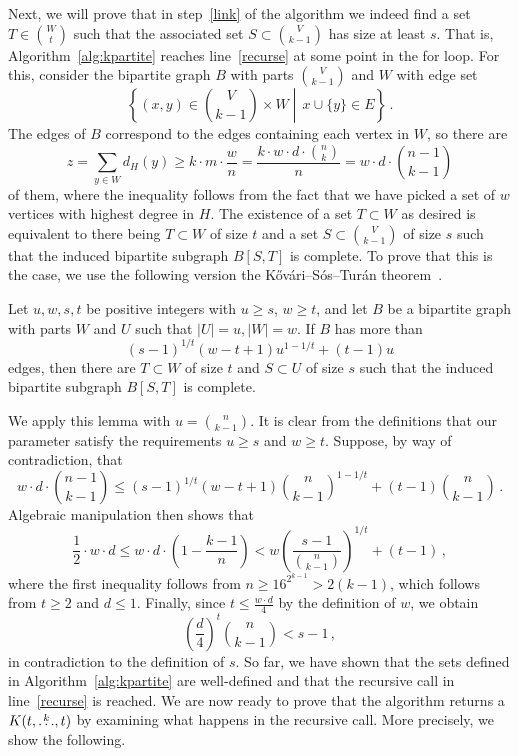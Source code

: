 Next, we will prove that in step~\ref{link} of the algorithm
we indeed find a set $T \in \binom{W}{t}$ such that the associated set
$S \subset \binom{V}{k-1}$ has size at least $s$.
That is, Algorithm~\ref{alg:kpartite} reaches line~\ref{recurse} at some point in the for loop.
For this, consider the bipartite graph $B$ with parts $\binom{V}{k-1}$ and $W$ with edge set
\[
  \left\{(x, y) \in \binom{V}{k-1} \times W \middle| \, x \cup \{y\} \in E \right\}\,.
\]
The edges of $B$ correspond to the edges containing each vertex in $W$, so there are
\[
    z = \sum_{y \in W} d_H(y) \geq k \cdot m \cdot \frac{w}{n} = \frac{k \cdot w \cdot d \cdot \binom{n}{k}}{n} = w \cdot d \cdot \binom{n - 1}{k-1}
\]
of them, where the inequality follows from the fact that we have picked a set of $w$ vertices with highest degree in $H$.
The existence of a set $T \subset W$ as desired is equivalent to there being $T \subset W$ of size $t$ and a set $S \subset \binom{V}{k-1}$ of size $s$
such that the induced bipartite subgraph $B[S, T]$ is complete.
To prove that this is the case,
we use the following version the Kőv\'{a}ri–S\'{o}s–Tur\'{a}n theorem~\cite{Kovari1954}.

\begin{lemma}\label{thm:kst}
    Let $u, w, s, t$ be positive integers with $u \geq s$, $w \geq t$, and let $B$ be a bipartite graph with parts $W$ and $U$ such that
    $|U| = u, |W| = w$.
    If $B$ has more than \[(s - 1)^{1 / t}(w - t + 1)u^{1 - 1 / t} + (t - 1)u\] edges, then there are
    $T \subset W$ of size $t$ and $S \subset U$ of size $s$ such that the induced bipartite subgraph $B[S, T]$ is complete.
\end{lemma}

We apply this lemma with $u = \binom{n}{k-1}$.
It is clear from the definitions that our parameter satisfy the requirements $u \geq s$ and $w \geq t$.
Suppose, by way of contradiction, that
\[
    w \cdot d \cdot \binom{n - 1}{k-1} \leq (s - 1)^{1 / t}(w - t + 1)\binom{n}{k-1}^{1 - 1 / t} + (t - 1)\binom{n}{k-1}\,.
\]
Algebraic manipulation then shows that
\[
    \frac{1}{2} \cdot w \cdot d
    \leq w \cdot d \cdot \left( 1 - \frac{k-1}{n} \right)
    < w \left( \frac{s-1}{\binom{n}{k-1} } \right)^{1 / t} + (t - 1)\,,
\]
where the first inequality follows from $n \geq 16^{2^{k-1}} > 2(k-1)$, which follows from $t \geq 2$ and $d \leq 1$.
Finally, since $t \leq \frac{w \cdot d}{4}$ by the definition of $w$, we obtain
\[
    \left( \frac{d}{4}\right)^t \binom{n}{k-1} < s-1\,,
\]
in contradiction to the definition of $s$.
So far, we have shown that the sets defined in Algorithm~\ref{alg:kpartite}
are well-defined and that the recursive call in line~\ref{recurse} is reached.
We are now ready to prove that the algorithm returns a $K(t, \overset{k}{\dots}, t)$
by examining what happens in the recursive call.
More precisely, we show the following.

